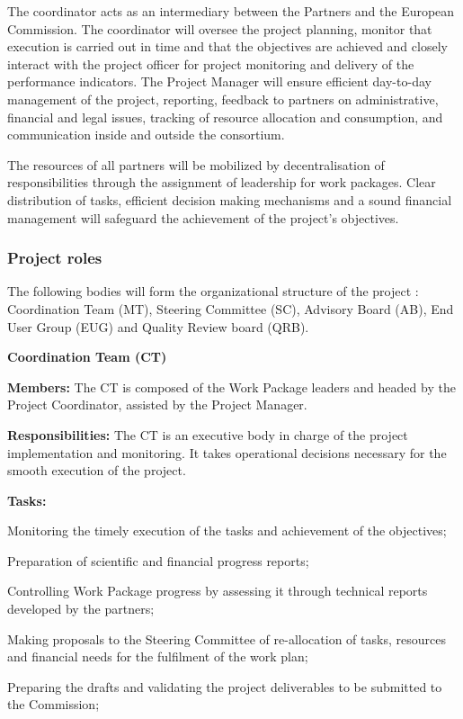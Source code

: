 The coordinator acts as an intermediary between the Partners and
the European Commission. The coordinator will oversee the project
planning, monitor that execution is carried out in time and that
the objectives are achieved and closely interact with the project
officer for project monitoring and delivery of the performance
indicators.  The Project Manager will ensure  efficient day-to-day
management of the project, reporting, feedback to partners on
administrative, financial and legal issues, tracking of  resource
allocation and consumption, and communication inside and outside the
consortium.

The resources of all partners will be mobilized by decentralisation of
responsibilities through the assignment of leadership for work
packages. Clear distribution of tasks, efficient decision making
mechanisms and a sound financial management will safeguard the
achievement of the project’s objectives.

\subsubsection{Project roles}

The following bodies will form the organizational structure of the
\TheProject project : Coordination Team (MT), Steering Committee (SC),
Advisory Board (AB), End User Group (EUG) and Quality Review board
(QRB).


\noindent\textbf{Coordination Team (CT)}\nobreak\par
\textbf{Members:} The CT is composed of the Work Package leaders
and headed by the Project Coordinator, assisted by the Project
Manager.

\textbf{Responsibilities:} The CT is an executive body in charge of
the project implementation and monitoring.
It takes operational decisions necessary for the smooth execution of
the project.

\textbf{Tasks:}
\begin{compactenum} 
\item Monitoring the timely execution of the tasks and achievement of
  the objectives;
\item Preparation of scientific and financial progress reports;
\item Controlling Work Package progress by assessing it through technical
  reports developed by the partners;
\item Making proposals to the Steering Committee of re-allocation of
  tasks, resources and financial needs for the fulfilment of the work
  plan;
\item Preparing the drafts and validating the project deliverables to
  be submitted to the Commission; 
\end{compactenum} 

